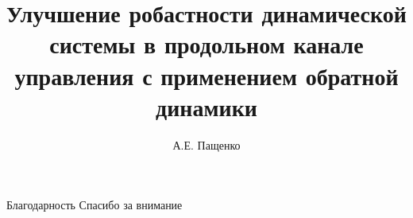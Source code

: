 \documentclass[unicode]{beamer}   %
\title[Дипломная работа]{Улучшение робастности динамической системы в продольном канале управления с применением обратной динамики}
\author{А.Е. Пащенко}
\institute[МАИ]{Московский авиационный институт}
\date{}
\begin{document}
\maketitle





% 


\begin{frame}{Благодарность}
\centering
\huge    %
Спасибо за внимание
\end{frame}
\end{document}
